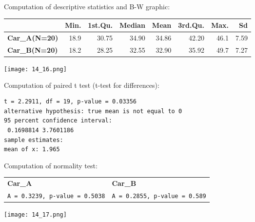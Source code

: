 \begin{frame}
  Computation of descriptive statistics and B-W graphic:\\
  \vspace{.3cm}
  \begin{scriptsize}
    \begin{center}
      \begin{tabular}{|l|rrrrrrr|}
        \hline
        & \textbf{Min}. & 1\textbf{st.Qu}. & \textbf{Median} & \textbf{Mean} & \textbf{3rd.Qu.} & \textbf{Max.} & \textbf{Sd}\\
        \hline
        \textbf{Car\_A(N=20)} & 18.9 & 30.75 & 34.90 & 34.86 & 42.20 & 46.1 & 7.59\\
        \textbf{Car\_B(N=20)} & 18.2 & 28.25 & 32.55 & 32.90 & 35.92 & 49.7 & 7.27\\
        \hline	
      \end{tabular}
      \texttt{[image: 14\_16.png]}
    \end{center}
  \end{scriptsize}
\end{frame}

\begin{frame}[fragile]
  Computation of paired t test (t-test for differences):\\
  \begin{verbatim}
t = 2.2911, df = 19, p-value = 0.03356
alternative hypothesis: true mean is not equal to 0
95 percent confidence interval:
 0.1698814 3.7601186
sample estimates:
mean of x: 1.965  
  \end{verbatim}
\end{frame}

\begin{frame}
  Computation of normality test:\\
  \vspace{.3cm}
  \begin{scriptsize}
    \begin{tabular}{ll}
      \textbf{Car\_A } & \textbf{Car\_B}\\
      \texttt{A = 0.3239, p-value = 0.5038} & \texttt{A = 0.2855, p-value = 0.589}\\
    \end{tabular} 
  \end{scriptsize}
  \begin{center}
  \texttt{[image: 14\_17.png]}
  \end{center}
\end{frame}

